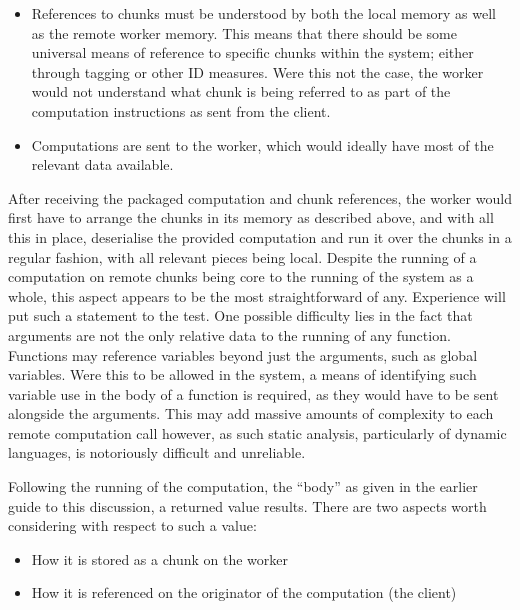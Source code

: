 \begin{itemize}
    \item
          References to chunks must be understood by both the local memory as
          well as the remote worker memory. This means that there should be some
          universal means of reference to specific chunks within the system;
          either through tagging or other ID measures. Were this not the case,
          the worker would not understand what chunk is being referred to as
          part of the computation instructions as sent from the client.
    \item
          Computations are sent to the worker, which would ideally have most of
          the relevant data available.
\end{itemize}

After receiving the packaged computation and chunk references, the
worker would first have to arrange the chunks in its memory as described
above, and with all this in place, deserialise the provided computation
and run it over the chunks in a regular fashion, with all relevant
pieces being local. Despite the running of a computation on remote
chunks being core to the running of the system as a whole, this aspect
appears to be the most straightforward of any. Experience will put such
a statement to the test. One possible difficulty lies in the fact that
arguments are not the only relative data to the running of any function.
Functions may reference variables beyond just the arguments, such as
global variables. Were this to be allowed in the system, a means of
identifying such variable use in the body of a function is required, as
they would have to be sent alongside the arguments. This may add massive
amounts of complexity to each remote computation call however, as such
static analysis, particularly of dynamic languages, is notoriously
difficult and unreliable.

Following the running of the computation, the ``body'' as given in the
earlier guide to this discussion, a returned value results. There are
two aspects worth considering with respect to such a value:

\begin{itemize}
    \item
          How it is stored as a chunk on the worker
    \item
          How it is referenced on the originator of the computation (the client)
\end{itemize}


